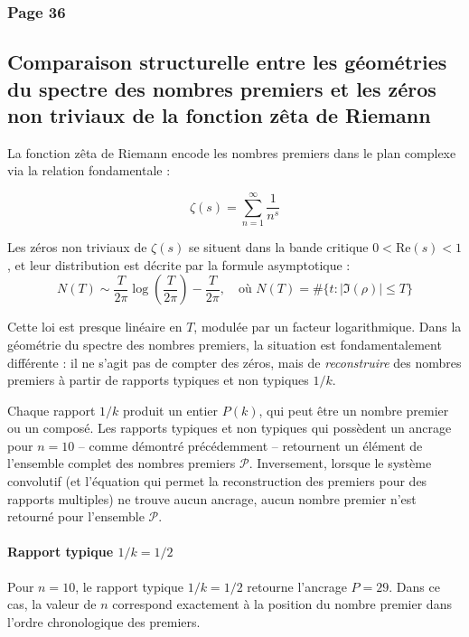 \documentclass[11pt,a4paper]{article}
\begin{document}

\subsubsection*{Page 36}

\subsection*{Comparaison structurelle entre les géométries du spectre des nombres premiers et les zéros non triviaux de la fonction zêta de Riemann}

La fonction zêta de Riemann encode les nombres premiers dans le plan complexe via la relation fondamentale :

$$\zeta(s) = \sum_{n=1}^{\infty} \frac{1}{n^{s}}$$

\begin{boiteexo}
Les zéros non triviaux de $\zeta(s)$ se situent dans la bande critique $0 < \text{Re}(s) < 1$, et leur distribution est décrite par la formule asymptotique :
$$N(T) \sim \frac{T}{2\pi} \log\!\left(\frac{T}{2\pi}\right) - \frac{T}{2\pi}, \quad \text{où } N(T) = \#\{t : |\Im(\rho)| \leq T\}$$
\end{boiteexo}

Cette loi est presque linéaire en $T$, modulée par un facteur logarithmique. Dans la géométrie du spectre des nombres premiers, la situation est fondamentalement différente : il ne s'agit pas de compter des zéros, mais de \emph{reconstruire} des nombres premiers à partir de rapports typiques et non typiques $1/k$.

Chaque rapport $1/k$ produit un entier $P(k)$, qui peut être un nombre premier ou un composé. Les rapports typiques et non typiques qui possèdent un ancrage pour $n=10$ -- comme démontré précédemment -- retournent un élément de l'ensemble complet des nombres premiers $\mathcal{P}$. Inversement, lorsque le système convolutif (et l'équation qui permet la reconstruction des premiers pour des rapports multiples) ne trouve aucun ancrage, aucun nombre premier n'est retourné pour l'ensemble $\mathcal{P}$.

\paragraph{Rapport typique $1/k = 1/2$}

Pour $n=10$, le rapport typique $1/k = 1/2$ retourne l'ancrage $P = 29$. Dans ce cas, la valeur de $n$ correspond exactement à la position du nombre premier dans l'ordre chronologique des premiers.
\end{document}
